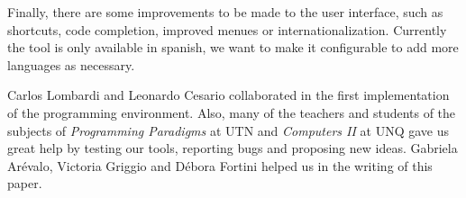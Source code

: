 \documentclass{sigplanconf}
\begin{document}
Finally, there are some improvements to be made to the user interface, such as shortcuts, code completion, improved menues or internationalization. Currently the tool is only available in spanish, we want to make it configurable to add more languages as necessary.

\acks

Carlos Lombardi and Leonardo Cesario collaborated in the first implementation of the programming environment. Also, many of the teachers and students of the subjects of \textit{Programming Paradigms} at UTN and \textit{Computers II} at UNQ gave us great help by testing our tools, reporting bugs and proposing new ideas. Gabriela Arévalo, Victoria Griggio and Débora Fortini helped us in the writing of this paper.

\nocite{Libe11,Mich00,Kouz07,Shan06,Shch95}


%
\end{document}
